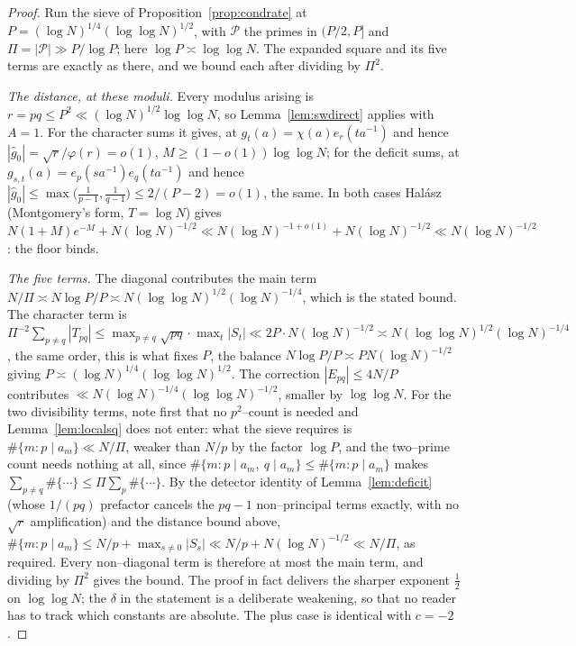 \documentclass[11pt]{article}
\theoremstyle{definition}
\begin{document}
\begin{proof}
Run the sieve of Proposition~\ref{prop:condrate} at
$P=(\log N)^{1/4}(\log\log N)^{1/2}$, with $\mathcal P$ the primes in $(P/2,P]$ and
$\Pi=|\mathcal P|\gg P/\log P$; here $\log P\asymp\log\log N$. The expanded square and its five
terms are exactly as there, and we bound each after dividing by $\Pi^2$.

\emph{The distance, at these moduli.} Every modulus arising is $r=pq\le P^2\ll(\log N)^{1/2}\log\log N$,
so Lemma~\ref{lem:swdirect} applies with $A=1$. For the character sums it gives, at
$g_t(a)=\chi(a)e_r(ta^{-1})$ and hence $|\widehat g_0|=\sqrt r/\varphi(r)=o(1)$,
$M\ge(1-o(1))\log\log N$; for the deficit sums, at $g_{s,t}(a)=e_p(sa^{-1})e_q(ta^{-1})$ and hence
$|\widehat g_0|\le\max\bigl(\tfrac1{p-1},\tfrac1{q-1}\bigr)\le2/(P-2)=o(1)$, the same. In both cases
Hal\'asz (Montgomery's form, $T=\log N$) gives
$N(1+M)e^{-M}+N(\log N)^{-1/2}\ll N(\log N)^{-1+o(1)}+N(\log N)^{-1/2}\ll N(\log N)^{-1/2}$: the
floor binds.

\emph{The five terms.} The diagonal contributes the main term $N/\Pi\asymp N\log P/P\asymp
N(\log\log N)^{1/2}(\log N)^{-1/4}$, which is the stated bound. The character term is
$\Pi^{-2}\sum_{p\ne q}|T_{pq}|\le\max_{p\ne q}\sqrt{pq}\cdot\max_t|S_t|\ll 2P\cdot N(\log N)^{-1/2}
\asymp N(\log\log N)^{1/2}(\log N)^{-1/4}$, the same order, this is what fixes $P$, the balance
$N\log P/P\asymp PN(\log N)^{-1/2}$ giving $P\asymp(\log N)^{1/4}(\log\log N)^{1/2}$. The correction
$|E_{pq}|\le4N/P$ contributes $\ll N(\log N)^{-1/4}(\log\log N)^{-1/2}$, smaller by $\log\log N$. For
the two divisibility terms, note first that no $p^2$--count is needed and Lemma~\ref{lem:localsq}
does not enter: what the sieve requires is $\#\{m:p\mid a_m\}\ll N/\Pi$, weaker than $N/p$ by the
factor $\log P$, and the two--prime count needs nothing at all, since
$\#\{m:p\mid a_m,\ q\mid a_m\}\le\#\{m:p\mid a_m\}$ makes
$\sum_{p\ne q}\#\{\cdots\}\le\Pi\sum_p\#\{\cdots\}$. By the detector identity of
Lemma~\ref{lem:deficit} (whose $1/(pq)$ prefactor cancels the $pq-1$ non--principal terms exactly,
with no $\sqrt r$ amplification) and the distance bound above,
$\#\{m:p\mid a_m\}\le N/p+\max_{s\ne0}|S_s|\ll N/p+N(\log N)^{-1/2}\ll N/\Pi$, as required. Every
non--diagonal term is therefore at most the main term, and dividing by $\Pi^2$ gives the bound.
The proof in fact delivers the sharper exponent $\tfrac12$ on $\log\log N$; the $\delta$ in the
statement is a deliberate weakening, so that no reader has to track which constants are absolute.
The plus case is identical with $c=-2$.
\end{proof}
\end{document}
